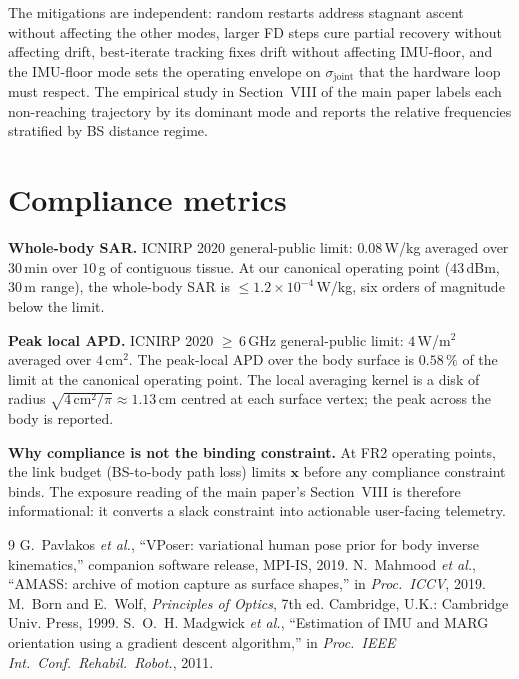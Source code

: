 \documentclass[10pt,journal,twocolumn]{IEEEtran}
\newcommand{\xx}{\mathbf{x}}
\theoremstyle{plain}
\theoremstyle{definition}
\begin{document}
The mitigations are independent: random restarts address stagnant
ascent without affecting the other modes, larger FD steps cure
partial recovery without affecting drift, best-iterate tracking
fixes drift without affecting IMU-floor, and the IMU-floor mode
sets the operating envelope on $\sigma_\mathrm{joint}$ that the
hardware loop must respect. The empirical study in
Section~VIII of the main paper labels each non-reaching
trajectory by its dominant mode and reports the relative
frequencies stratified by BS distance regime.

\section{Compliance metrics}\label{si:compliance}

\textbf{Whole-body SAR.} ICNIRP 2020 general-public limit:
$0.08\,$W/kg averaged over $30\,$min over $10\,$g of contiguous
tissue. At our canonical operating point ($43\,$dBm, $30\,$m
range), the whole-body SAR is $\leq 1.2 \times 10^{-4}\,$W/kg,
six orders of magnitude below the limit.

\textbf{Peak local APD.} ICNIRP 2020 ${\geq}\,6\,$GHz general-public
limit: $4\,$W/m$^{2}$ averaged over $4\,$cm$^{2}$. The peak-local
APD over the body surface is $0.58\,\%$ of the limit at the
canonical operating point. The local averaging kernel is a disk
of radius $\sqrt{4\,\mathrm{cm}^{2}/\pi} \approx 1.13\,$cm centred
at each surface vertex; the peak across the body is reported.

\textbf{Why compliance is not the binding constraint.} At FR2
operating points, the link budget (BS-to-body path loss) limits
$\xx$ before any compliance constraint binds. The exposure reading
of the main paper's Section~VIII is therefore informational: it
converts a slack constraint into actionable user-facing telemetry.


\begin{thebibliography}{9}
 G.~Pavlakos \emph{et al.}, ``VPoser:
variational human pose prior for body inverse kinematics,''
companion software release, MPI-IS, 2019.
 N.~Mahmood \emph{et al.}, ``AMASS: archive of
motion capture as surface shapes,'' in \emph{Proc.\ ICCV}, 2019.
 M.~Born and E.~Wolf, \emph{Principles of Optics},
7th ed. Cambridge, U.K.: Cambridge Univ. Press, 1999.
 S.~O.~H. Madgwick \emph{et al.}, ``Estimation
of IMU and MARG orientation using a gradient descent algorithm,''
in \emph{Proc.\ IEEE Int.\ Conf.\ Rehabil.\ Robot.}, 2011.
\end{thebibliography}
\end{document}
